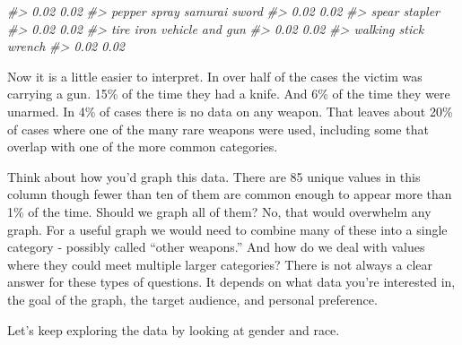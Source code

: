 \documentclass[
]{krantz}
\makeatletter
\newenvironment{Shaded}{\begin{snugshade}}{\end{snugshade}}
\newcommand{\CommentTok}[1]{\textcolor[rgb]{0.37,0.37,0.37}{\textit{#1}}}
\newcommand{\DecValTok}[1]{\textcolor[rgb]{0.06,0.06,0.06}{#1}}
\newcommand{\FunctionTok}[1]{\textcolor[rgb]{0,0,0}{#1}}
\newcommand{\NormalTok}[1]{#1}
\newcommand{\SpecialCharTok}[1]{\textcolor[rgb]{0,0,0}{#1}}
\newenvironment{kframe}{%
\medskip{}
\setlength{\fboxsep}{.8em}
 \def\at@end@of@kframe{}%
 \ifinner\ifhmode%
  \def\at@end@of@kframe{\end{minipage}}%
  \begin{minipage}{\columnwidth}%
 \fi\fi%
 \def\FrameCommand##1{\hskip\@totalleftmargin \hskip-\fboxsep
 \colorbox{shadecolor}{##1}\hskip-\fboxsep
     \hskip-\linewidth \hskip-\@totalleftmargin \hskip\columnwidth}%
 \MakeFramed {\advance\hsize-\width
   \@totalleftmargin\z@ \linewidth\hsize
   \@setminipage}}%
 {\par\unskip\endMakeFramed%
 \at@end@of@kframe}
\renewenvironment{Shaded}{\begin{kframe}}{\end{kframe}}
\makeatother
\begin{document}
\begin{Shaded}
\begin{Highlighting}[]
\CommentTok{\#\textgreater{}                             0.02                             0.02 }
\CommentTok{\#\textgreater{}                     pepper spray                    samurai sword }
\CommentTok{\#\textgreater{}                             0.02                             0.02 }
\CommentTok{\#\textgreater{}                            spear                          stapler }
\CommentTok{\#\textgreater{}                             0.02                             0.02 }
\CommentTok{\#\textgreater{}                        tire iron                  vehicle and gun }
\CommentTok{\#\textgreater{}                             0.02                             0.02 }
\CommentTok{\#\textgreater{}                    walking stick                           wrench }
\CommentTok{\#\textgreater{}                             0.02                             0.02}
\end{Highlighting}
\end{Shaded}

Now it is a little easier to interpret. In over half of the cases the victim was carrying a gun. 15\% of the time they had a knife. And 6\% of the time they were unarmed. In 4\% of cases there is no data on any weapon. That leaves about 20\% of cases where one of the many rare weapons were used, including some that overlap with one of the more common categories.

Think about how you'd graph this data. There are 85 unique values in this column though fewer than ten of them are common enough to appear more than 1\% of the time. Should we graph all of them? No, that would overwhelm any graph. For a useful graph we would need to combine many of these into a single category - possibly called ``other weapons.'' And how do we deal with values where they could meet multiple larger categories? There is not always a clear answer for these types of questions. It depends on what data you're interested in, the goal of the graph, the target audience, and personal preference.

Let's keep exploring the data by looking at gender and race.

\begin{Shaded}
\end{Shaded}
\end{document}
